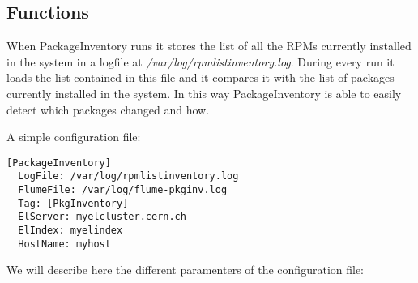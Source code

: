 \subsection{Functions}

When PackageInventory runs it stores the list of all the RPMs currently
installed in the system in a logfile at
\textit{/var/log/rpmlistinventory.log}. During every run it loads the list
contained in this file and it compares it with the list of packages
currently installed in the system. In this way PackageInventory is able to
easily detect which packages changed and how.

A simple configuration file:


\begin{lstlisting}[frame=single]
  [PackageInventory]
  LogFile: /var/log/rpmlistinventory.log
  FlumeFile: /var/log/flume-pkginv.log
  Tag: [PkgInventory]
  ElServer: myelcluster.cern.ch
  ElIndex: myelindex
  HostName: myhost
\end{lstlisting}

We will describe here the different paramenters of the configuration file:


